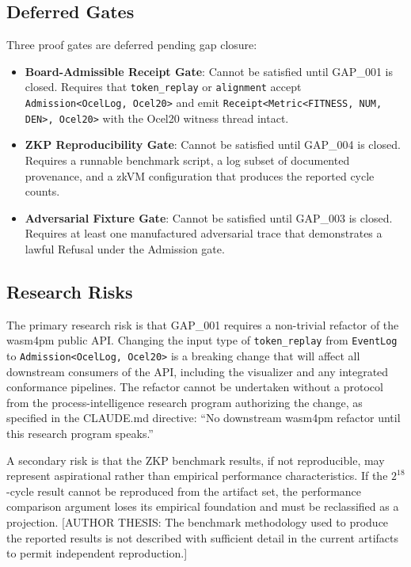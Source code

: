 \subsection{Deferred Gates}
\label{sec:experiments-core-open-deferred}

Three proof gates are deferred pending gap closure:

\begin{itemize}
  \item \textbf{Board-Admissible Receipt Gate}: Cannot be satisfied until GAP\_001 is
    closed. Requires that \texttt{token\_replay} or \texttt{alignment} accept
    \texttt{Admission<OcelLog, Ocel20>} and emit \texttt{Receipt<Metric<FITNESS, NUM, DEN>, Ocel20>}
    with the Ocel20 witness thread intact.
  \item \textbf{ZKP Reproducibility Gate}: Cannot be satisfied until GAP\_004 is closed.
    Requires a runnable benchmark script, a log subset of documented provenance, and
    a zkVM configuration that produces the reported cycle counts.
  \item \textbf{Adversarial Fixture Gate}: Cannot be satisfied until GAP\_003 is closed.
    Requires at least one manufactured adversarial trace that demonstrates a lawful
    Refusal under the Admission gate.
\end{itemize}

\subsection{Research Risks}
\label{sec:experiments-core-open-risks}

The primary research risk is that GAP\_001 requires a non-trivial refactor of the
wasm4pm public API. Changing the input type of \texttt{token\_replay} from
\texttt{EventLog} to \texttt{Admission<OcelLog, Ocel20>} is a breaking change that
will affect all downstream consumers of the API, including the visualizer and any
integrated conformance pipelines. The refactor cannot be undertaken without a
protocol from the process-intelligence research program authorizing the change, as
specified in the CLAUDE.md directive: ``No downstream wasm4pm refactor until this
research program speaks.''

A secondary risk is that the ZKP benchmark results, if not reproducible, may represent
aspirational rather than empirical performance characteristics. If the $2^{18}$-cycle
result cannot be reproduced from the artifact set, the performance comparison argument
loses its empirical foundation and must be reclassified as a projection. [AUTHOR THESIS:
The benchmark methodology used to produce the reported results is not described with
sufficient detail in the current artifacts to permit independent reproduction.]

